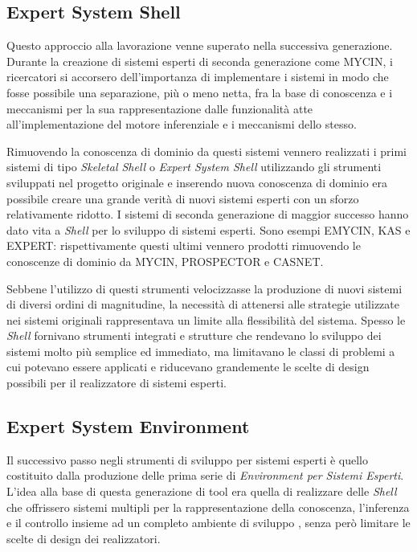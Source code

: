 \subsection{Expert System Shell}

Questo approccio alla lavorazione venne superato nella successiva generazione. Durante la creazione di sistemi esperti di seconda generazione come MYCIN, i ricercatori si accorsero dell'importanza di implementare i sistemi in modo che fosse possibile una separazione, più o meno netta, fra la base di conoscenza e i meccanismi per la sua rappresentazione dalle funzionalità atte all'implementazione del motore inferenziale e i meccanismi dello stesso.

Rimuovendo la conoscenza di dominio da questi sistemi vennero realizzati i primi sistemi di tipo \emph{Skeletal Shell} o \emph{Expert System Shell} utilizzando gli strumenti sviluppati nel progetto originale e inserendo nuova conoscenza di dominio era possibile creare una grande verità di nuovi sistemi esperti con un sforzo relativamente ridotto. I sistemi di seconda generazione di maggior successo hanno dato vita a \emph{Shell} per lo sviluppo di sistemi esperti. Sono esempi EMYCIN, KAS e EXPERT: rispettivamente questi ultimi vennero prodotti rimuovendo le conoscenze di dominio da MYCIN, PROSPECTOR e CASNET.

Sebbene l'utilizzo di questi strumenti velocizzasse la produzione di nuovi sistemi di diversi ordini di magnitudine, la necessità di attenersi alle strategie utilizzate nei sistemi originali rappresentava un limite alla flessibilità del sistema. Spesso le \emph{Shell} fornivano strumenti integrati e strutture che rendevano lo sviluppo dei sistemi molto più semplice ed immediato, ma limitavano le classi di problemi a cui potevano essere applicati e riducevano grandemente le scelte di design possibili per il realizzatore di sistemi esperti. \cite{development1993}

\subsection{Expert System Environment}

Il successivo passo negli strumenti di sviluppo per sistemi esperti è quello costituito dalla produzione delle prima serie di \emph{Environment per Sistemi Esperti}. L'idea alla base di questa generazione di tool era quella di realizzare delle \emph{Shell} che offrissero sistemi multipli per la rappresentazione della conoscenza, l'inferenza e il controllo insieme ad un completo ambiente di sviluppo \cite{development1993}, senza però limitare le scelte di design dei realizzatori.

